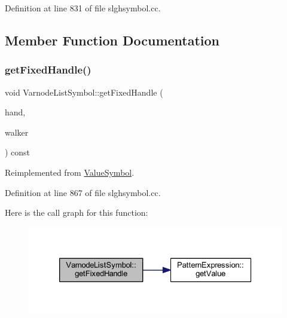 Definition at line 831 of file slghsymbol.\+cc.



\subsection{Member Function Documentation}
\mbox{\label{class_varnode_list_symbol_aa4366d8c21b4969bff3cefde9893b25c}} 
\subsubsection{\texorpdfstring{getFixedHandle()}{getFixedHandle()}}
{\footnotesize\ttfamily void Varnode\+List\+Symbol\+::get\+Fixed\+Handle (\begin{DoxyParamCaption}\item[{\mbox{\hyperlink{struct_fixed_handle}{Fixed\+Handle}} \&}]{hand,  }\item[{\mbox{\hyperlink{class_parser_walker}{Parser\+Walker}} \&}]{walker }\end{DoxyParamCaption}) const\hspace{0.3cm}{\ttfamily [virtual]}}



Reimplemented from \mbox{\hyperlink{class_value_symbol_a8eeefeaf224149a7f81a301dc505a705}{Value\+Symbol}}.



Definition at line 867 of file slghsymbol.\+cc.

Here is the call graph for this function\+:
\nopagebreak
\begin{figure}[H]
\begin{center}
\leavevmode
\includegraphics[width=326pt]{class_varnode_list_symbol_aa4366d8c21b4969bff3cefde9893b25c_cgraph}
\end{center}
\end{figure}
\mbox{\label{class_varnode_list_symbol_a5958ff2358b0884cf1696eff69d51a18}} 
